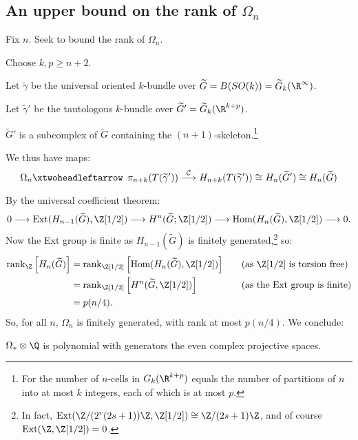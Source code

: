 \documentclass[11pt]{article}
\begin{document}
\begin{SignatureThmTalk}
\pagebreak
\subsection*{An upper bound on the rank of $\Omega_n$}
Fix $n$. Seek to bound the rank of $\Omega_n$.
\begin{itemise}
\item Choose $k,p\geq n+2$.
\item Let $\widetilde \gamma$ be the universal oriented $k$-bundle over $\widetilde G=B(SO(k))=\widetilde G_k(\R^\infty)$.
\item Let $\widetilde \gamma'$ be the tautologous $k$-bundle over $\widetilde G'=\widetilde G_k(\R^{k+p})$.
\item $\widetilde G'$ is a subcomplex of $\widetilde G$ containing the $(n+1)$-skeleton.\footnote{For the number of $n$-cells in $G_k(\R^{k+p})$ equals the number of partitions of $n$ into at most $k$ integers, each of which is at most $p$.}
\item We thus have maps:
\[\Omega_n\leftfibration\pi_{n+k}(T(\widetilde\gamma'))\overset{\calC}{\to}H_{n+k}(T(\widetilde\gamma'))\cong H_{n}(\widetilde G')\cong H_n(\widetilde G)\]
\item By the universal coefficient theorem:
\[0\to\Ext(H_{n-1}(\widetilde G),\Z[1/2])\to H^{n}(\widetilde G;\Z[1/2])\to \Hom(H_n(\widetilde G),\Z[1/2])\to0.\]
Now the Ext group is finite as $H_{n-1}(\widetilde G)$ is finitely generated,\footnote{In fact, $\Ext(\Z/(2^r(2s+1))\Z,\Z[1/2])\cong \Z/(2s+1)\Z$, and of course $\Ext(\Z,\Z[1/2])=0$.} so:
\begin{alignat*}{2}
\rank_\Z \left[H_n(\widetilde G)\right]&=\rank_{\Z[1/2]} \left[\Hom(H_n(\widetilde G),\Z[1/2])\right]&\quad&\text{(as $\Z[1/2]$ is torsion free)}\\
&=\rank_{\Z[1/2]}\left[H^n(\widetilde G,\Z[1/2])\right]&&\text{(as the $\Ext$ group is finite)}\\
&=p(n/4).
\end{alignat*}
So, for all $n$, $\Omega_n$ is finitely generated, with rank at most $p(n/4)$. We conclude:
\end{itemise}
\begin{thm*}
$\Omega_*\otimes\Q$ is polynomial with generators the even complex projective spaces.
\end{thm*}

\end{SignatureThmTalk}
\end{document}
